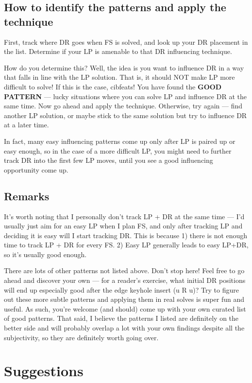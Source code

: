 \documentclass[12pt,letter]{article}
\newcommand{\p}{\textquotesingle}
\newcommand{\ps}{\p\,\,}
\begin{document}
\subsection{How to identify the patterns and apply the technique}
First, track where DR goes when FS is solved, and look up your DR placement in the list. Determine if your LP is amenable to that DR influencing technique. 

How do you determine this? Well, the idea is you want to influence DR in a way that falls in line with the LP solution. That is, it should NOT make LP more difficult to solve! If this is the case,  cibfeats! You have found the \textbf{GOOD PATTERN} --- lucky situations where you can solve LP and influence DR at the same time. Now go ahead and apply the technique. Otherwise, try again --- find another LP solution, or maybe stick to the same solution but try to influence DR at a later time. 

In fact, many easy influencing patterns come up only after LP is paired up or easy enough, so in the case of a more difficult LP, you might need to further track DR into the first few LP moves, until you see a good influencing opportunity come up.


\subsection{Remarks}
It's worth noting that I personally don't track LP + DR at the same time --- I’d usually just aim for an easy LP when I plan FS, and only after tracking LP and deciding it is easy will I start tracking DR. This is because 1) there is not enough time to track LP + DR for every FS. 2) Easy LP generally leads to easy LP+DR, so it's usually good enough.

There are lots of other patterns not listed above. Don't stop here! Feel free to go ahead and discover your own --- for  a reader’s exercise, what initial DR positions will end up especially good after the edge keyhole insert (u\ps R u)? Try to figure out these more subtle patterns and applying them in real solves is super fun and useful. As such, you're welcome (and should) come up with your own curated list of good patterns. That said, I believe the patterns I listed are definitely on the better side and will probably overlap a lot with your own findings despite all the subjectivity, so they are definitely worth going over.

\section{Suggestions}
\end{document}
